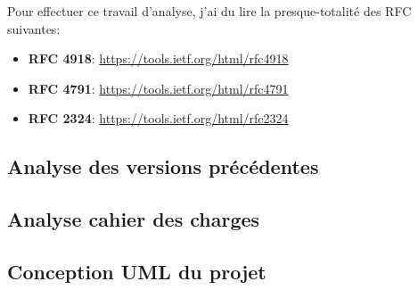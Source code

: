 Pour effectuer ce travail d'analyse, j'ai du lire la presque-totalité des RFC suivantes:
\begin{itemize}
    \item \textbf{RFC 4918}: \url{https://tools.ietf.org/html/rfc4918}
    \item \textbf{RFC 4791}: \url{https://tools.ietf.org/html/rfc4791}
    \item \textbf{RFC 2324}: \url{https://tools.ietf.org/html/rfc2324}
\end{itemize}

\subsection{Analyse des versions précédentes}

\subsection{Analyse cahier des charges}

\subsection{Conception UML du projet}
